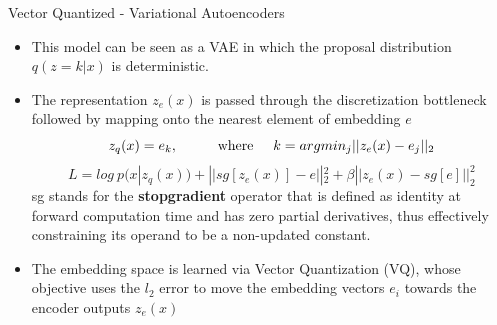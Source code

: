 \begin{frame}[allowframebreaks]{Vector Quantized - Variational Autoencoders}
\begin{itemize}
    \item  This model can be seen as a VAE in which the proposal distribution $q(z = k|x)$ is deterministic.
    \item The representation $z_e(x)$ is passed through the discretization bottleneck followed by mapping onto the nearest element of embedding $e$\\
    $$z_q(x) = e_k, \hspace{1cm} \text{where} \hspace{0.5cm} k = argmin_j ||z_e(x) - e_j||_2$$
    $$L = log \: p(x|z_q(x)) + ||sg[z_e(x)] - e||^2_2 + \beta||z_e(x) - sg[e]||_2^2$$
    sg stands for the \textbf{stopgradient} operator that is defined as identity at forward computation time and has zero partial derivatives, thus effectively constraining its operand to be a non-updated constant. 
    \item The embedding space is learned via Vector Quantization (VQ), whose objective uses the $l_2$ error to move the embedding vectors $e_i$ towards the encoder outputs $z_e(x)$
    
\end{itemize}
\end{frame}

